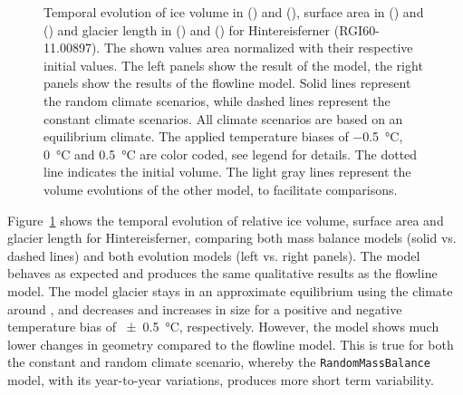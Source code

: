 \begin{figure}[p]
          \caption{Temporal evolution of ice volume in () and (), surface area in () and () and glacier length in () and () for Hintereisferner (RGI60-11.00897). The shown values area normalized with their respective initial values. The left panels show the result of the \vas{} model, the right panels show the results of the flowline model. Solid lines represent the random climate scenarios, while dashed lines represent the constant climate scenarios. All climate scenarios are based on an equilibrium climate. The applied temperature biases of \SI{-.5}{\celsius}, \SI{0}{\celsius} and \SI{+.5}{\celsius} are color coded, see legend for details. The dotted line indicates the initial volume. The light gray lines represent the volume evolutions of the other model, to facilitate comparisons.}
          \label{fig:hintereisferner}
        \end{figure}

        Figure~\ref{fig:hintereisferner} shows the temporal evolution of relative ice volume, surface area and glacier length for Hintereisferner, comparing both mass balance models (solid vs. dashed lines) and both evolution models (left vs. right panels). The \vas{} model behaves as expected and produces the same qualitative results as the flowline model. The model glacier stays in an approximate equilibrium using the climate around \tstar, and decreases and increases in size for a positive and negative temperature bias of \SI{\pm0.5}{\celsius}, respectively. However, the \vas{} model shows much lower changes in geometry compared to the flowline model. This is true for both the constant and random climate scenario, whereby the \lstinline`RandomMassBalance` model, with its year-to-year variations, produces more short term variability.


